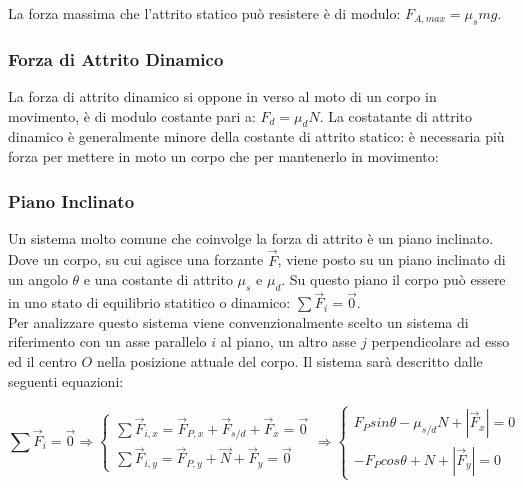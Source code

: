 \documentclass{article}
\numberwithin{equation}{subsection}
\begin{document}
La forza massima che l'attrito statico può resistere è 
di modulo: $F_{A,max}=\mu_smg$.

\subsubsection{Forza di Attrito Dinamico}
La forza di attrito dinamico si oppone in verso al moto di un corpo 
in movimento, è di modulo costante pari a: $F_d=\mu_dN$. La 
costatante di attrito dinamico è generalmente minore della 
costante di attrito statico: è necessaria più forza per 
mettere in moto un corpo che per mantenerlo in movimento:

\begin{center}\end{center}

\subsubsection{Piano Inclinato}
Un sistema molto comune che coinvolge la forza di attrito 
è un piano inclinato. Dove un corpo, su cui agisce una forzante 
$\vec{F}$, viene posto su un piano inclinato 
di un angolo $\theta$ e una costante di attrito $\mu_s$ e 
$\mu_d$. Su questo piano il corpo può essere in uno stato di 
equilibrio statitico o dinamico: $\sum\vec{F}_i=\vec{0}$.\\
Per analizzare questo sistema viene convenzionalmente scelto 
un sistema di riferimento con un asse parallelo $i$ al piano, 
un altro asse $j$ perpendicolare ad esso ed il centro $O$ 
nella posizione attuale del corpo.
Il sistema sarà descritto dalle seguenti equazioni:

\begin{equation}
    \sum\vec{F}_i=\vec{0}\Rightarrow
    \begin{cases}
        \sum\vec{F}_{i,x}=\vec{F}_{P,x}+\vec{F}_{s/d}+\vec{F}_x=\vec{0}\\
        \sum\vec{F}_{i,y}=\vec{F}_{P,y}+\vec{N}+\vec{F}_y=\vec{0}
    \end{cases}\Rightarrow
    \begin{cases}
        F_Psin\theta-\mu_{s/d}N+\left|\vec{F}_x\right|=0\\
        -F_Pcos\theta+N+\left|\vec{F}_y\right|=0
    \end{cases}
\end{equation}
\end{document}
